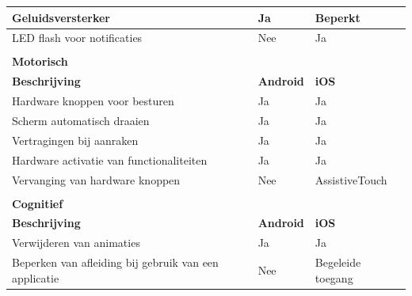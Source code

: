 \begin{table}
\begin{tabular}{|l|l|l|}
        \hline
        Geluidsversterker                                     & Ja                & Beperkt            \\ 
        \hline
        LED flash voor notificaties                           & Nee               & Ja                 \\ 
        \hline
        \multicolumn{3}{|l|}{}                                                                         \\ 
        \hline
        \multicolumn{3}{|l|}{\textbf{Motorisch}}                                                       \\ 
        \hline
        \textbf{Beschrijving}                                 & \textbf{Android}  & \textbf{iOS}       \\ 
        \hline
        Hardware knoppen voor besturen                        & Ja                & Ja                 \\ 
        \hline
        Scherm automatisch draaien                            & Ja                & Ja                 \\ 
        \hline
        Vertragingen bij aanraken                             & Ja                & Ja                 \\ 
        \hline
        Hardware activatie van functionaliteiten              & Ja                & Ja                 \\ 
        \hline
        Vervanging van hardware knoppen                       & Nee               & AssistiveTouch     \\ 
        \hline
        \multicolumn{3}{|l|}{}                                                                         \\ 
        \hline
        \multicolumn{3}{|l|}{\textbf{Cognitief}}                                                       \\ 
        \hline
        \textbf{Beschrijving}                                 & \textbf{Android}  & \textbf{iOS}       \\ 
        \hline
        Verwijderen van animaties                             & Ja                & Ja                 \\ 
        \hline
        Beperken van afleiding bij gebruik van een applicatie & Nee               & Begeleide toegang  \\
        \hline
    \end{tabular}
\end{table}